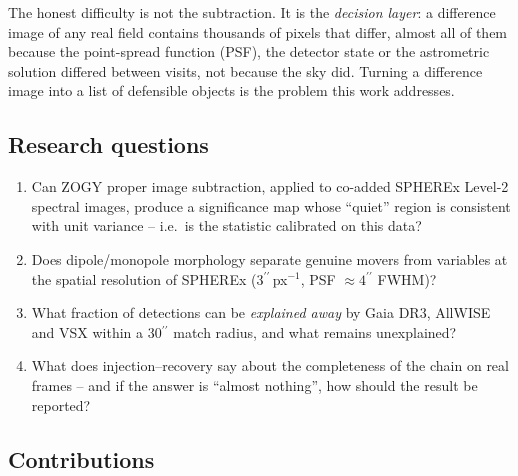 \documentclass[11pt,a4paper]{article}
\newcommand{\arcsec}{\ensuremath{{}^{\prime\prime}}}
\begin{document}
The honest difficulty is not the subtraction. It is the \emph{decision layer}: a difference image
of any real field contains thousands of pixels that differ, almost all of them because the
point-spread function (PSF), the detector state or the astrometric solution differed between visits,
not because the sky did. Turning a difference image into a list of defensible objects is the
problem this work addresses.

\subsection{Research questions}

\begin{enumerate}[leftmargin=1.4em,itemsep=2pt]
\item[\textbf{RQ1}] Can ZOGY proper image subtraction, applied to co-added SPHEREx Level-2 spectral
      images, produce a significance map whose ``quiet'' region is consistent with unit variance --
      i.e.\ is the statistic calibrated on this data?
\item[\textbf{RQ2}] Does dipole/monopole morphology separate genuine movers from variables at the
      spatial resolution of SPHEREx ($3\arcsec$\,px$^{-1}$, PSF $\approx 4\arcsec$ FWHM)?
\item[\textbf{RQ3}] What fraction of detections can be \emph{explained away} by Gaia DR3, AllWISE and
      VSX within a 30\arcsec{} match radius, and what remains unexplained?
\item[\textbf{RQ4}] What does injection--recovery say about the completeness of the chain on real
      frames -- and if the answer is ``almost nothing'', how should the result be reported?
\end{enumerate}

\subsection{Contributions}
\end{document}
